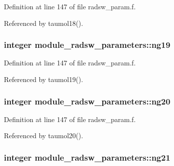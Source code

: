 Definition at line 147 of file radsw\+\_\+param.\+f.



Referenced by taumol18().

\subsubsection[{\texorpdfstring{ng19}{ng19}}]{\setlength{\rightskip}{0pt plus 5cm}integer module\+\_\+radsw\+\_\+parameters\+::ng19}\hypertarget{namespacemodule__radsw__parameters_ab3551e23105cd3515e887e877407dc39}{}\label{namespacemodule__radsw__parameters_ab3551e23105cd3515e887e877407dc39}


Definition at line 147 of file radsw\+\_\+param.\+f.



Referenced by taumol19().

\subsubsection[{\texorpdfstring{ng20}{ng20}}]{\setlength{\rightskip}{0pt plus 5cm}integer module\+\_\+radsw\+\_\+parameters\+::ng20}\hypertarget{namespacemodule__radsw__parameters_a1619a2243f1cb29e4393598fa0bc4c8f}{}\label{namespacemodule__radsw__parameters_a1619a2243f1cb29e4393598fa0bc4c8f}


Definition at line 147 of file radsw\+\_\+param.\+f.



Referenced by taumol20().

\subsubsection[{\texorpdfstring{ng21}{ng21}}]{\setlength{\rightskip}{0pt plus 5cm}integer module\+\_\+radsw\+\_\+parameters\+::ng21}\hypertarget{namespacemodule__radsw__parameters_ab029caf0ee0c1195539643bef00e0598}{}\label{namespacemodule__radsw__parameters_ab029caf0ee0c1195539643bef00e0598}


